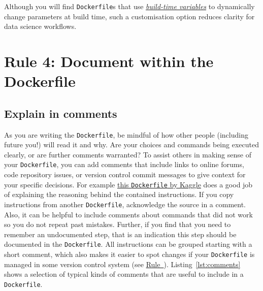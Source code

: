 \documentclass[10pt,letterpaper]{article}
\begin{document}
Although you will find \texttt{Dockerfile}s that use
\href{https://docs.docker.com/engine/reference/commandline/build/\#set-build-time-variables---build-arg}{\emph{build-time
variables}} to dynamically change parameters at build time, such a
customisation option reduces clarity for data science workflows.

\hypertarget{rule-4-document-within-the-dockerfile}{%
\section{Rule 4: Document within the
Dockerfile}\label{rule-4-document-within-the-dockerfile}}

  \label{rule:document} 

\hypertarget{explain-in-comments}{%
\subsection{Explain in comments}\label{explain-in-comments}}

As you are writing the \texttt{Dockerfile}, be mindful of how other
people (including future you!) will read it and why. Are your choices
and commands being executed clearly, or are further comments warranted?
To assist others in making sense of your \texttt{Dockerfile}, you can
add comments that include links to online forums, code repository
issues, or version control commit messages to give context for your
specific decisions. For example
\href{https://github.com/Kaggle/docker-rstats/blob/master/Dockerfile}{this
\texttt{Dockerfile} by Kaggle} does a good job of explaining the
reasoning behind the contained instructions. If you copy instructions
from another \texttt{Dockerfile}, acknowledge the source in a comment.
Also, it can be helpful to include comments about commands that did not
work so you do not repeat past mistakes. Further, if you find that you
need to remember an undocumented step, that is an indication this step
should be documented in the \texttt{Dockerfile}. All instructions can be
grouped starting with a short comment, which also makes it easier to
spot changes if your \texttt{Dockerfile} is managed in some version
control system (see
\hyperref[{rule:publish}]{Rule~}).
Listing~\ref{lst:comments} shows a selection of typical kinds of
comments that are useful to include in a \texttt{Dockerfile}.

\scriptsize
\end{document}

